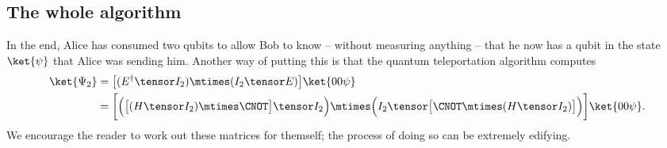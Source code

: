\subsection{The whole algorithm}\label{sec:whole-algorithm}
In the end, Alice has consumed two qubits to allow Bob to know -- without
measuring anything -- that he now has a qubit in the state $\ket{\psi}$ that
Alice was sending him.  Another way of putting this is that the quantum
teleportation algorithm computes
\begin{align*}
  \ket{\Psi_2}
    &= \big[(E^\dag \tensor I_2) \mtimes (I_2 \tensor E)\big]\ket{00\psi} \\
    &= \bigg[
         \Big(\big[(H \tensor I_2) \mtimes \CNOT\big] \tensor I_2\Big)
         \mtimes
         \Big(I_2 \tensor \big[\CNOT \mtimes (H \tensor I_2)\big]\Big)
       \bigg]\ket{00\psi}.
\end{align*}
We encourage the reader to work out these matrices for themself; the process of
doing so can be extremely edifying.
